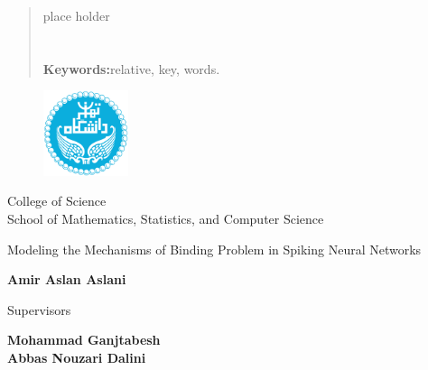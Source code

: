 \documentclass[12pt]{report}
\begin{document}
	\linespread{1}
	\begin{latin}
		\begin{abstract}
			place holder
			
			\section*{}
			\textbf{Keywords:}\quad relative, key, words.
		\end{abstract}
		\newpage
		
		\begin{figure}
			\centering
			\includegraphics[height=2.5cm]{ut.png}
		\end{figure}
		\begin{center}
			
			College of Science\\
			School of Mathematics, Statistics, and Computer Science
		\end{center}
		
		\begin{center}
		\end{center}
		
		\begin{center}
			\huge{Modeling the Mechanisms of Binding Problem in Spiking Neural Networks}
		\end{center}
		
		\begin{center}
		\end{center}
		
		\begin{center}
			\textbf{
				Amir Aslan Aslani
				\\[30pt]
			}
		\end{center}
		
		
		\begin{center}
			Supervisors
		\end{center}
		\begin{center}
			\textbf{
				Mohammad Ganjtabesh
				\\[5pt]
				Abbas Nouzari Dalini
			}
		\end{center}
		

\end{latin}
\end{document}
